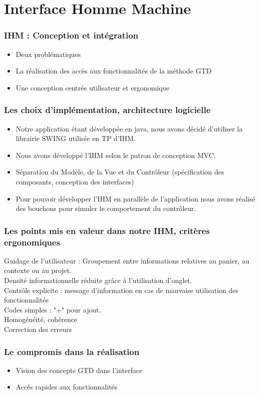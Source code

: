 \section{Interface Homme Machine}

\begin{frame}
\frametitle{IHM : Conception et int\'egration}
\begin{itemize}
  \item Deux probl\'ematiques
  \item La r\'ealisation des acc\`es aux fonctionnalit\'es de la m\'ethode GTD
  \item Une conception centr\'ee utilisateur et ergonomique
\end{itemize}
\end{frame}

\begin{frame}
\frametitle{Les choix d'impl\'ementation, architecture logicielle}
\begin{itemize}
\item Notre application \'etant d\'evelopp\'ee en java, nous avons d\'ecid\'e d'utiliser la librairie SWING utilis\'ee en TP d'IHM.
\item Nous avons d\'evelopp\'e l'IHM selon le patron de conception MVC.
\item S\'eparation du Mod\`ele, de la Vue et du Contr\^oleur (sp\'ecification
des composants, conception des interfaces)
\item Pour pouvoir d\'evelopper l'IHM en parall\`ele de l'application nous
avons r\'ealis\'e des bouchons pour simuler le comportement du contr\^oleur.
\end{itemize}
\end{frame}

\begin{frame}
\frametitle{Les points mis en valeur dans notre IHM, crit\`eres ergonomiques}
\alert{Guidage de l'utilisateur} : Groupement entre informations relatives au panier, au contexte ou au projet.\\
\alert{Densit\'e informationnelle} r\'eduite gr\^ace \^a l'utilisation d'onglet.\\
\alert{Contr\^ole explicite} : message d'information en cas de mauvaise utilisation des fonctionnalit\'es\\
\alert{Codes simples} : "+" pour ajout.\\
\alert{Homog\'en\'eit\'e, coh\'erence}\\
\alert{Correction des erreurs}\\
\end{frame}


\begin{frame}
\frametitle{Le compromis dans la r\'ealisation}
\begin{itemize}
  \item Vision des concepts GTD dans l'interface
  \item Acc\'es rapides aux fonctionnalit\'es
\end{itemize}
\end{frame}